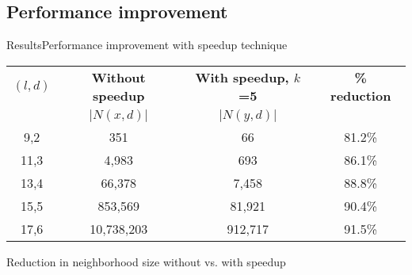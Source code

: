 \documentclass[pdf,xcolor={dvipsnames}]{beamer}
\begin{document}
	\subsection{Performance improvement}
	\begin{frame}{Results}{Performance improvement with speedup technique}
		\begin{table}[h] %
			\footnotesize
			\renewcommand{\arraystretch}{1.3}
			\label{tbl:neighbors_blockmasking}
			\centering
			\begin{tabular}{|c|c|c|c|}
			\hline 
			\bfseries\boldmath $(l,d)$ & \bfseries\boldmath Without speedup & \bfseries\boldmath With speedup, $k$=5 & \bfseries \% reduction\\
			 & $|N(x,d)|$ & $|N(y,d)|$ & \\
			\hline
			 9,2 &         351  &       66 & 81.2\%\\
			11,3 &       4,983  &      693 & 86.1\%\\
			13,4 &      66,378  &    7,458 & 88.8\%\\
			15,5 &     853,569  &   81,921 & 90.4\%\\
			17,6 &  10,738,203  &  912,717 & 91.5\%\\
			\hline\end{tabular}
			\end{table}

			{\centering \footnotesize Reduction in neighborhood size without vs. with speedup \\}
		\end{frame}
\end{document}
